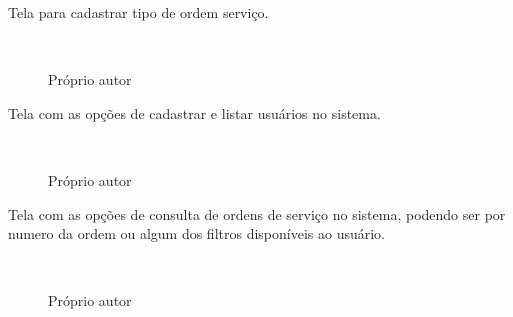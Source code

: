 Tela para cadastrar tipo de ordem serviço.

\begin{figure}[H]
		\caption{\label{Cadastro_Tipo_Ordem}Próprio autor}
	\centering
	\mbox{%
		\qquad
	}
	
\end{figure}
\newpage


Tela com as opções de cadastrar e listar usuários no sistema.

\begin{figure}[H]
		\caption{\label{listagem_e_cadastro_de_usuario}Próprio autor}
	\centering
	\mbox{%
		\qquad
	}
	
\end{figure}
\newpage

Tela com as opções de consulta de ordens de serviço no sistema, podendo ser por numero da ordem ou algum dos filtros disponíveis ao usuário.

\begin{figure}[H]
		\caption{\label{Consulta_ordem}Próprio autor}
	\centering
	\mbox{%
		\qquad
	}
	
\end{figure}
\newpage
